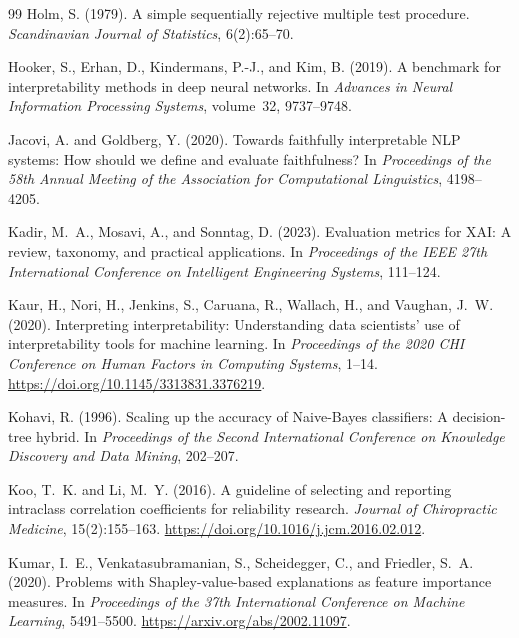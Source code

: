 \documentclass[10pt]{article}
\begin{document}
\begin{thebibliography}{99}
Holm, S. (1979).
A simple sequentially rejective multiple test procedure.
\emph{Scandinavian Journal of Statistics}, 6(2):65--70.

Hooker, S., Erhan, D., Kindermans, P.-J., and Kim, B. (2019).
A benchmark for interpretability methods in deep neural networks.
In \emph{Advances in Neural Information Processing Systems}, volume~32,
9737--9748.

Jacovi, A. and Goldberg, Y. (2020).
Towards faithfully interpretable {NLP} systems: How should we define and
evaluate faithfulness?
In \emph{Proceedings of the 58th Annual Meeting of the Association for
Computational Linguistics}, 4198--4205.

Kadir, M.~A., Mosavi, A., and Sonntag, D. (2023).
Evaluation metrics for XAI: A review, taxonomy, and practical applications.
In \emph{Proceedings of the IEEE 27th International Conference on
Intelligent Engineering Systems}, 111--124.

Kaur, H., Nori, H., Jenkins, S., Caruana, R., Wallach, H., and
Vaughan, J.~W. (2020).
Interpreting interpretability: Understanding data scientists' use of
interpretability tools for machine learning.
In \emph{Proceedings of the 2020 {CHI} Conference on Human Factors in
Computing Systems}, 1--14.
\url{https://doi.org/10.1145/3313831.3376219}.

Kohavi, R. (1996).
Scaling up the accuracy of Naive-Bayes classifiers: A decision-tree hybrid.
In \emph{Proceedings of the Second International Conference on Knowledge
Discovery and Data Mining}, 202--207.

Koo, T.~K. and Li, M.~Y. (2016).
A guideline of selecting and reporting intraclass correlation coefficients
for reliability research.
\emph{Journal of Chiropractic Medicine}, 15(2):155--163.
\url{https://doi.org/10.1016/j.jcm.2016.02.012}.

Kumar, I.~E., Venkatasubramanian, S., Scheidegger, C., and
Friedler, S.~A. (2020).
Problems with {Shapley}-value-based explanations as feature importance
measures.
In \emph{Proceedings of the 37th International Conference on Machine
Learning}, 5491--5500.
\url{https://arxiv.org/abs/2002.11097}.


\end{thebibliography}
\end{document}
